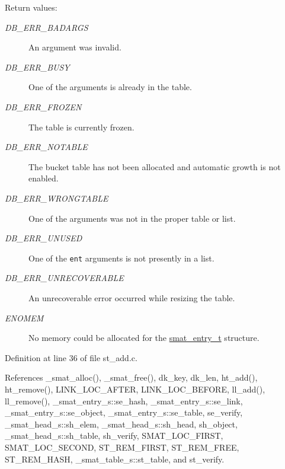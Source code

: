 \begin{Desc}
\item[Return values:]
\begin{description}
\item[{\em DB\_\-ERR\_\-BADARGS}]An argument was invalid. \item[{\em DB\_\-ERR\_\-BUSY}]One of the arguments is already in the table. \item[{\em DB\_\-ERR\_\-FROZEN}]The table is currently frozen. \item[{\em DB\_\-ERR\_\-NOTABLE}]The bucket table has not been allocated and automatic growth is not enabled. \item[{\em DB\_\-ERR\_\-WRONGTABLE}]One of the arguments was not in the proper table or list. \item[{\em DB\_\-ERR\_\-UNUSED}]One of the {\tt ent} arguments is not presently in a list. \item[{\em DB\_\-ERR\_\-UNRECOVERABLE}]An unrecoverable error occurred while resizing the table. \item[{\em ENOMEM}]No memory could be allocated for the \hyperlink{group__dbprim__smat_ga2}{smat\_\-entry\_\-t} structure.\end{description}
\end{Desc}


Definition at line 36 of file st\_\-add.c.

References \_\-smat\_\-alloc(), \_\-smat\_\-free(), dk\_\-key, dk\_\-len, ht\_\-add(), ht\_\-remove(), LINK\_\-LOC\_\-AFTER, LINK\_\-LOC\_\-BEFORE, ll\_\-add(), ll\_\-remove(), \_\-smat\_\-entry\_\-s::se\_\-hash, \_\-smat\_\-entry\_\-s::se\_\-link, \_\-smat\_\-entry\_\-s::se\_\-object, \_\-smat\_\-entry\_\-s::se\_\-table, se\_\-verify, \_\-smat\_\-head\_\-s::sh\_\-elem, \_\-smat\_\-head\_\-s::sh\_\-head, sh\_\-object, \_\-smat\_\-head\_\-s::sh\_\-table, sh\_\-verify, SMAT\_\-LOC\_\-FIRST, SMAT\_\-LOC\_\-SECOND, ST\_\-REM\_\-FIRST, ST\_\-REM\_\-FREE, ST\_\-REM\_\-HASH, \_\-smat\_\-table\_\-s::st\_\-table, and st\_\-verify.

